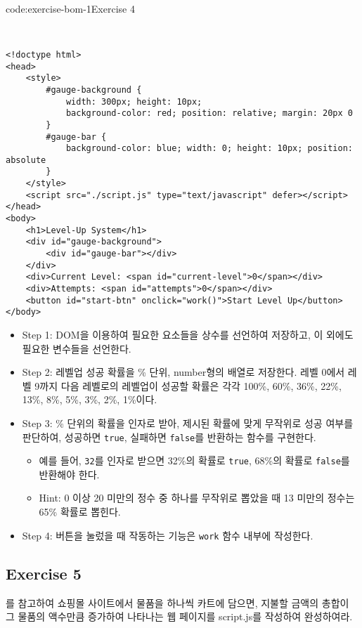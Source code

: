 \begin{codeenv}{code:exercise-bom-1}{Exercise 4}\begin{verbatim}


<!doctype html>
<head>
    <style>
        #gauge-background {
            width: 300px; height: 10px;
            background-color: red; position: relative; margin: 20px 0
        }
        #gauge-bar {
            background-color: blue; width: 0; height: 10px; position: absolute
        }
    </style>
    <script src="./script.js" type="text/javascript" defer></script>
</head>
<body>
    <h1>Level-Up System</h1>
    <div id="gauge-background">
        <div id="gauge-bar"></div>
    </div>
    <div>Current Level: <span id="current-level">0</span></div>
    <div>Attempts: <span id="attempts">0</span></div>
    <button id="start-btn" onclick="work()">Start Level Up</button>
</body>
\end{verbatim}
\end{codeenv}

\begin{itemize}
    \item Step 1: DOM을 이용하여 필요한 요소들을 상수를 선언하여 저장하고, 이 외에도 필요한 변수들을 선언한다.
    \item Step 2: 레벨업 성공 확률을 \% 단위, number형의 배열로 저장한다. 레벨 0에서 레벨 9까지 다음 레벨로의 레벨업이 성공할 확률은 각각 100\%, 60\%, 36\%, 22\%, 13\%, 8\%, 5\%, 3\%, 2\%, 1\%이다.
    \item Step 3: \% 단위의 확률을 인자로 받아, 제시된 확률에 맞게 무작위로 성공 여부를 판단하여, 성공하면 \texttt{true}, 실패하면 \texttt{false}를 반환하는 함수를 구현한다.
    \begin{itemize}
        \item 예를 들어, \texttt{32}를 인자로 받으면 32\%의 확률로 \texttt{true}, 68\%의 확률로 \texttt{false}를 반환해야 한다.
        \item Hint: 0 이상 20 미만의 정수 중 하나를 무작위로 뽑았을 때 13 미만의 정수는 65\% 확률로 뽑힌다.
    \end{itemize}
    \item Step 4: 버튼을 눌렀을 때 작동하는 기능은 \texttt{work} 함수 내부에 작성한다.
\end{itemize}

\subsection*{Exercise 5}

를 참고하여 쇼핑몰 사이트에서 물품을 하나씩 카트에 담으면, 지불할 금액의 총합이 그 물품의 액수만큼 증가하여 나타나는 웹 페이지를 script.js를 작성하여 완성하여라.

